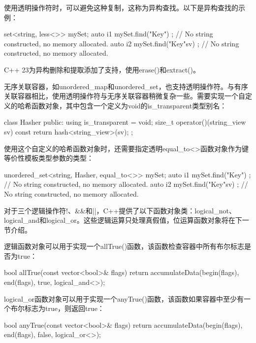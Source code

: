 使用透明操作符时，可以避免这种复制，这称为异构查找。以下是异构查找的示例：

\begin{cpp}
set<string, less<>> mySet;
auto i1 { mySet.find("Key") }; // No string constructed, no memory allocated.
auto i2 { mySet.find("Key"sv) }; // No string constructed, no memory allocated.
\end{cpp}

C++ 23为异构删除和提取添加了支持，使用erase()和extract()。

无序关联容器，如unordered\_map和unordered\_set，也支持透明操作符。与有序关联容器相比，使用透明操作符与无序关联容器稍微复杂一些。需要实现一个自定义的哈希函数对象，其中包含一个定义为void的is\_transparent类型别名：

\begin{cpp}
class Hasher
{
    public:
        using is_transparent = void;
        size_t operator()(string_view sv) const { return hash<string_view>{}(sv); }
};
\end{cpp}

使用这个自定义的哈希函数对象时，还需要指定透明equal\_to<>函数对象作为键等价性模板类型参数的类型：

\begin{cpp}
unordered_set<string, Hasher, equal_to<>> mySet;
auto i1 { mySet.find("Key") }; // No string constructed, no memory allocated.
auto i2 { mySet.find("Key"sv) }; // No string constructed, no memory allocated.
\end{cpp}


对于三个逻辑操作符!、\&\&和||，C++提供了以下函数对象类：logical\_not、logical\_and和logical\_or。这些逻辑运算只处理真假值，位运算函数对象将在下一节介绍。

逻辑函数对象可以用于实现一个allTrue()函数，该函数检查容器中所有布尔标志是否为true：

\begin{cpp}
bool allTrue(const vector<bool>& flags)
{
    return accumulateData(begin(flags), end(flags), true, logical_and<>{});
}
\end{cpp}

logical\_or函数对象可以用于实现一个anyTrue()函数，该函数如果容器中至少有一个布尔标志为true，则返回true：

\begin{cpp}
bool anyTrue(const vector<bool>& flags)
{
    return accumulateData(begin(flags), end(flags), false, logical_or<>{});
}
\end{cpp}

